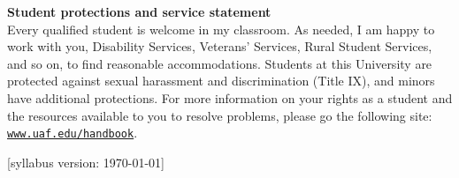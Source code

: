 \documentclass[12pt]{article}
\renewcommand{\emph}[1]{\textsf{\textbf{#1}}}
\newcommand{\localhead}[1]{\par\smallskip\textbf{#1} \smallskip\nobreak\\}%
\def\subheading#1{\localhead{\emph{#1}}}
\begin{document}
\subheading{Student protections and service statement}
Every qualified student is welcome in my classroom.  As needed, I am happy to work with you, Disability Services, Veterans' Services, Rural Student Services, and so on, to find reasonable accommodations.  Students at this University are protected against sexual harassment and discrimination (Title IX), and minors have additional protections.  For more information on your rights as a student and the resources available to you to resolve problems, please go the following site: \href{https://www.uaf.edu/handbook/}{\texttt{www.uaf.edu/handbook}}.

\hfill  \scriptsize [syllabus version: \today] \normalsize
\end{document}
